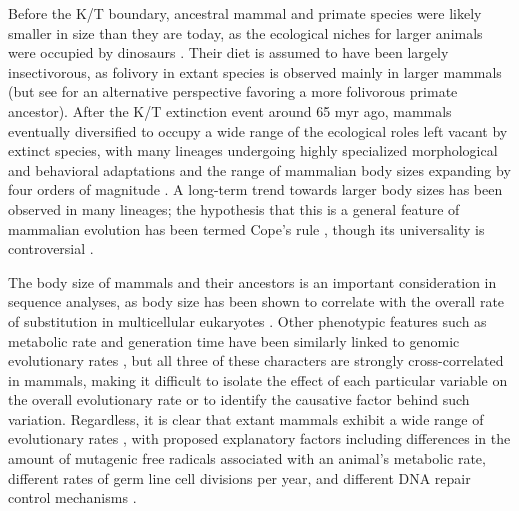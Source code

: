 Before the K/T boundary, ancestral mammal and primate species were
likely smaller in size than they are today, as the ecological niches
for larger animals were occupied by dinosaurs
\citep{Martin2007,Smith2010}. Their diet is assumed to have been
largely insectivorous, as folivory in extant species is observed
mainly in larger mammals \citep{Smith2010} (but see \citet{Martin2007}
for an alternative perspective favoring a more folivorous primate
ancestor). After the K/T extinction event around 65 \ac{myr} ago,
mammals eventually diversified to occupy a wide range of the
ecological roles left vacant by extinct species, with many lineages
undergoing highly specialized morphological and behavioral adaptations
and the range of mammalian body sizes expanding by four orders of
magnitude \citep{Alroy1998}. A long-term trend towards larger body
sizes has been observed in many lineages; the hypothesis that this is
a general feature of mammalian evolution has been termed Cope's rule
\citep{Alroy1998}, though its universality is controversial
\citep{Finarelli2006,Monroe2010}.

The body size of mammals and their ancestors is an important
consideration in sequence analyses, as body size has been shown to
correlate with the overall rate of substitution in multicellular
eukaryotes
\citep{Mouse2002Initial,Hwang2004a,Welch2008,Galtier2009,Romiguier2010,
  Bromham2011}.  Other phenotypic features such as metabolic rate and
generation time have been similarly linked to genomic evolutionary
rates \citep{Martin1993,Nabholz2008}, but all three of these
characters are strongly cross-correlated in mammals, making it
difficult to isolate the effect of each particular variable on the
overall evolutionary rate or to identify the causative factor behind
such variation. Regardless, it is clear that extant mammals exhibit a
wide range of evolutionary rates \citep{BinindaEmonds2007b}, with
proposed explanatory factors including differences in the amount of
mutagenic free radicals associated with an animal's metabolic rate,
different rates of germ line cell divisions per year, and different
DNA repair control mechanisms \citep{Baer2007}.

